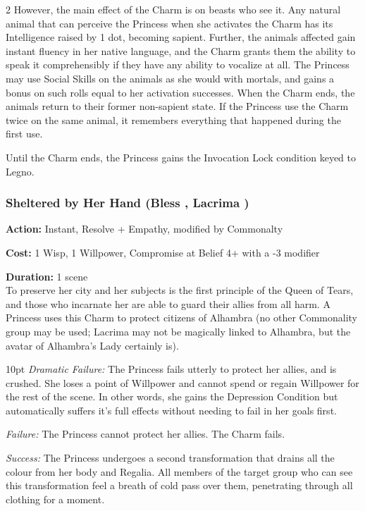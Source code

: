 \begin{multicols}{2}
However, the main effect of the Charm is on beasts who see it. Any natural animal that can perceive the Princess when she activates the Charm has its Intelligence raised by 1 dot, becoming sapient. Further, the animals affected gain instant fluency in her native language, and the Charm grants them the ability to speak it comprehensibly if they have any ability to vocalize at all. The Princess may use Social Skills on the animals as she would with mortals, and gains a bonus on such rolls equal to her activation successes. When the Charm ends, the animals return to their former non-sapient state. If the Princess use the Charm twice on the same animal, it remembers everything that happened during the first use.

Until the Charm ends, the Princess gains the Invocation Lock condition keyed to Legno.

\subsubsection*{Sheltered by Her Hand (Bless \textbullet\textbullet\textbullet\textbullet\textbullet, Lacrima \textbullet\textbullet\textbullet\textbullet)}

\noindent \textbf{Action:} Instant, Resolve + Empathy, modified by Commonalty

\noindent \textbf{Cost:} 1 Wisp, 1 Willpower, Compromise at Belief 4+ with a -3 modifier

\noindent \textbf{Duration:} 1 scene \\

\noindent To preserve her city and her subjects is the first principle of the Queen of Tears, and those who incarnate her are able to guard their allies from all harm. A Princess uses this Charm to protect citizens of Alhambra (no other Commonality group may be used; Lacrima may not be magically linked to Alhambra, but the avatar of Alhambra's Lady certainly is).

\begin{myindentpar}{10pt}    \emph{Dramatic Failure:} The Princess fails utterly to protect her allies, and is crushed. She loses a point of Willpower and cannot spend or regain Willpower for the rest of the scene. In other words, she gains the Depression Condition but automatically suffers it's full effects without needing to fail in her goals first. 

    \emph{Failure:} The Princess cannot protect her allies. The Charm fails.

    \emph{Success:} The Princess undergoes a second transformation that drains all the colour from her body and Regalia. All members of the target group who can see this transformation feel a breath of cold pass over them, penetrating through all clothing for a moment. 
    

\end{myindentpar}
\end{multicols}

